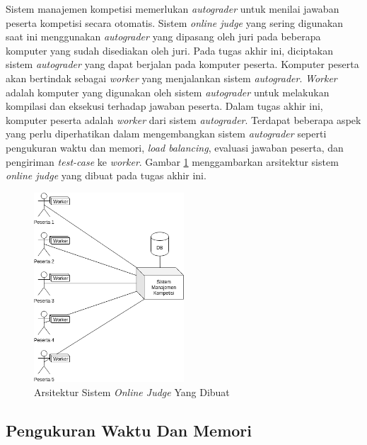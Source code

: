 \par Sistem manajemen kompetisi memerlukan \textit{autograder} untuk menilai jawaban peserta kompetisi secara otomatis. Sistem \textit{online judge} yang sering digunakan saat ini menggunakan \textit{autograder} yang dipasang oleh juri pada beberapa komputer yang sudah disediakan oleh juri. Pada tugas akhir ini, diciptakan sistem \textit{autograder} yang dapat berjalan pada komputer peserta. Komputer peserta akan bertindak sebagai \textit{worker} yang menjalankan sistem \textit{autograder}. \textit{Worker} adalah komputer yang digunakan oleh sistem \textit{autograder} untuk melakukan kompilasi dan eksekusi terhadap jawaban peserta. Dalam tugas akhir ini, komputer peserta adalah \textit{worker} dari sistem \textit{autograder}. Terdapat beberapa aspek yang perlu diperhatikan dalam mengembangkan sistem \textit{autograder} seperti pengukuran waktu dan memori, \textit{load balancing}, evaluasi jawaban peserta, dan pengiriman \textit{test-case} ke \textit{worker}. Gambar \ref{fig:architecture-new} menggambarkan arsitektur sistem \textit{online judge} yang dibuat pada tugas akhir ini.

\begin{figure}[ht!]
    \centering
    \includegraphics[width=0.5\textwidth]{images/architecture-new}
    \caption{Arsitektur Sistem \textit{Online Judge} Yang Dibuat}
    \label{fig:architecture-new}
\end{figure}

\subsection{Pengukuran Waktu Dan Memori} \label{subsec:time-memory-measure}

